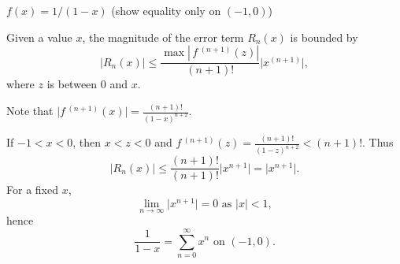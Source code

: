 {$f(x) = 1/(1-x)$ (show equality only on $(-1,0)$)
}
{Given a value $x$, the magnitude of the error term $R_n(x)$ is bounded by
$$ \big|R_n(x)\big| \leq \frac{\max\left|\,f\,^{(n+1)}(z)\right|}{(n+1)!}\big|x^{(n+1)}\big|,$$
where $z$ is between $0$ and $x$. 

Note that $\big|f\,^{(n+1)}(x)\big| = \frac{(n+1)!}{(1-x)^{n+2}}$. 


 
If $-1<x<0$, then $x<z<0$ and $f\,^{(n+1)}(z) =\frac{(n+1)!}{(1-z)^{n+2}}<(n+1)!$. 
Thus
$$ \big|R_n(x)\big| \leq \frac{(n+1)!}{(n+1)!}\big|x^{n+1}\big|= \big|x^{n+1}\big|.$$
For a fixed $x$,
$$\lim_{n\to\infty} \big|x^{n+1}\big|=0 \text{ as } |x|<1,$$
hence
$$\frac{1}{1-x} = \sum_{n=0}^\infty x^n \text{ on } (-1,0).$$


}